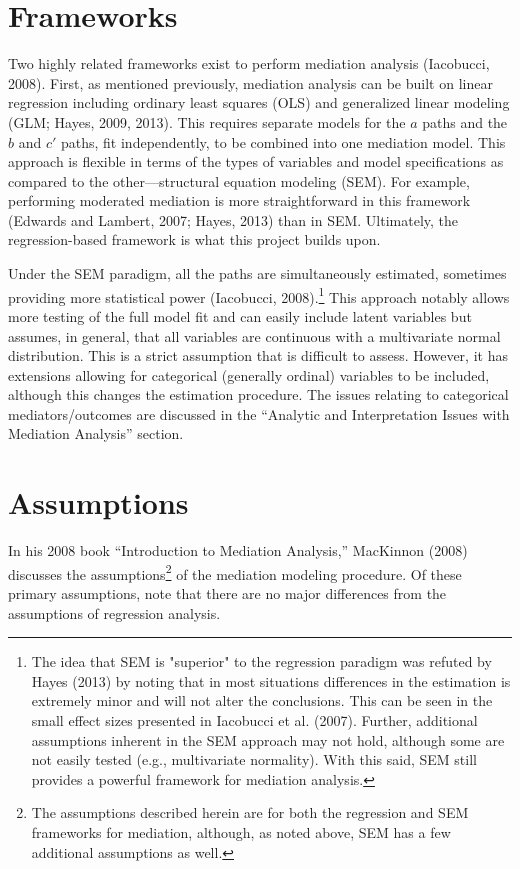 \documentclass[]{DissertateUSU}
\let\rmarkdownfootnote\footnote%
\def\footnote{\protect\rmarkdownfootnote}
\begin{document}
\section{Frameworks}\label{frameworks}

Two highly related frameworks exist to perform mediation analysis
(Iacobucci, 2008). First, as mentioned previously, mediation analysis
can be built on linear regression including ordinary least squares (OLS)
and generalized linear modeling (GLM; Hayes, 2009, 2013). This requires
separate models for the \(a\) paths and the \(b\) and \(c'\) paths, fit
independently, to be combined into one mediation model. This approach is
flexible in terms of the types of variables and model specifications as
compared to the other---structural equation modeling (SEM). For example,
performing moderated mediation is more straightforward in this framework
(Edwards and Lambert, 2007; Hayes, 2013) than in SEM. Ultimately, the
regression-based framework is what this project builds upon.

Under the SEM paradigm, all the paths are simultaneously estimated,
sometimes providing more statistical power (Iacobucci,
2008).\footnote{The idea that SEM is "superior" to the regression paradigm was refuted by Hayes (2013) by noting that in most situations differences in the estimation is extremely minor and will not alter the conclusions. This can be seen in the small effect sizes presented in Iacobucci et al. (2007). Further, additional assumptions inherent in the SEM approach may not hold, although some are not easily tested (e.g., multivariate normality). With this said, SEM still provides a powerful framework for mediation analysis.}
This approach notably allows more testing of the full model fit and can
easily include latent variables but assumes, in general, that all
variables are continuous with a multivariate normal distribution. This
is a strict assumption that is difficult to assess. However, it has
extensions allowing for categorical (generally ordinal) variables to be
included, although this changes the estimation procedure. The issues
relating to categorical mediators/outcomes are discussed in the
``Analytic and Interpretation Issues with Mediation Analysis'' section.

\section{Assumptions}\label{assumptions}

In his 2008 book ``Introduction to Mediation Analysis,'' MacKinnon
(2008) discusses the
assumptions\footnote{The assumptions described herein are for both the regression and SEM frameworks for mediation, although, as noted above, SEM has a few additional assumptions as well.}
of the mediation modeling procedure. Of these primary assumptions, note
that there are no major differences from the assumptions of regression
analysis.
\end{document}
